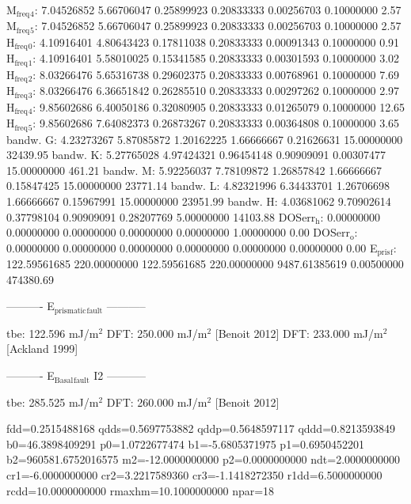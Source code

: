 \documentclass[11pt]{article}
\begin{document}
M\(_{\text{freq}}\)\(_{\text{4}}\):   7.04526852   5.66706047   0.25899923   0.20833333   0.00256703   0.10000000         2.57
M\(_{\text{freq}}\)\(_{\text{5}}\):   7.04526852   5.66706047   0.25899923   0.20833333   0.00256703   0.10000000         2.57
H\(_{\text{freq}}\)\(_{\text{0}}\):   4.10916401   4.80643423   0.17811038   0.20833333   0.00091343   0.10000000         0.91
H\(_{\text{freq}}\)\(_{\text{1}}\):   4.10916401   5.58010025   0.15341585   0.20833333   0.00301593   0.10000000         3.02
H\(_{\text{freq}}\)\(_{\text{2}}\):   8.03266476   5.65316738   0.29602375   0.20833333   0.00768961   0.10000000         7.69
H\(_{\text{freq}}\)\(_{\text{3}}\):   8.03266476   6.36651842   0.26285510   0.20833333   0.00297262   0.10000000         2.97
H\(_{\text{freq}}\)\(_{\text{4}}\):   9.85602686   6.40050186   0.32080905   0.20833333   0.01265079   0.10000000        12.65
H\(_{\text{freq}}\)\(_{\text{5}}\):   9.85602686   7.64082373   0.26873267   0.20833333   0.00364808   0.10000000         3.65
bandw. G:   4.23273267   5.87085872   1.20162225   1.66666667   0.21626631  15.00000000     32439.95
bandw. K:   5.27765028   4.97424321   0.96454148   0.90909091   0.00307477  15.00000000       461.21
bandw. M:   5.92256037   7.78109872   1.26857842   1.66666667   0.15847425  15.00000000     23771.14
bandw. L:   4.82321996   6.34433701   1.26706698   1.66666667   0.15967991  15.00000000     23951.99
bandw. H:   4.03681062   9.70902614   0.37798104   0.90909091   0.28207769   5.00000000     14103.88
DOSerr\(_{\text{h}}\):   0.00000000   0.00000000   0.00000000   0.00000000   0.00000000   1.00000000         0.00
DOSerr\(_{\text{o}}\):   0.00000000   0.00000000   0.00000000   0.00000000   0.00000000   0.00000000         0.00
E\(_{\text{pris}}\)\(_{\text{f}}\): 122.59561685 220.00000000 122.59561685 220.00000000 9487.61385619   0.00500000    474380.69


----------     E\(_{\text{prismatic}}\)\(_{\text{fault}}\)     -----------

tbe:       122.596 mJ/m\(^{\text{2}}\)
DFT:       250.000 mJ/m\(^{\text{2}}\) [Benoit  2012]
DFT:       233.000 mJ/m\(^{\text{2}}\) [Ackland 1999]

----------     E\(_{\text{Basal}}\)\(_{\text{fault}}\) I2     -----------

tbe:       285.525 mJ/m\(^{\text{2}}\)
DFT:       260.000 mJ/m\(^{\text{2}}\) [Benoit  2012]

fdd=0.2515488168 qdds=0.5697753882 qddp=0.5648597117 qddd=0.8213593849 b0=46.3898409291 p0=1.0722677474 b1=-5.6805371975 p1=0.6950452201 b2=960581.6752016575 m2=-12.0000000000 p2=0.0000000000 ndt=2.0000000000 cr1=-6.0000000000 cr2=3.2217589360 cr3=-1.1418272350 r1dd=6.5000000000 rcdd=10.0000000000
rmaxhm=10.1000000000 npar=18 
\end{document}

